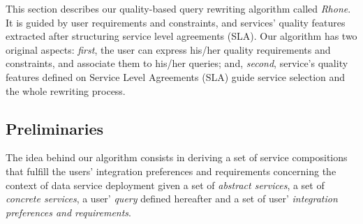 This section describes our quality-based query rewriting algorithm called \textit{Rhone}. It is guided by user requirements and constraints, and services' quality features extracted after structuring service level agreements (SLA). Our algorithm has two original aspects: \textit{first}, the user can express his/her quality requirements and constraints, and associate them to his/her queries; and, \textit{second}, service's quality features defined on Service Level Agreements (SLA) guide service selection and the whole rewriting process. 

\subsection{Preliminaries}

The idea behind our algorithm consists in deriving a set of service compositions that fulfill the users' integration preferences and requirements concerning the context of data service deployment given a set of \textit{abstract services}, a set of \textit{concrete services}, a user' \textit{query} defined hereafter and a set of user' \textit{integration preferences and requirements}.

